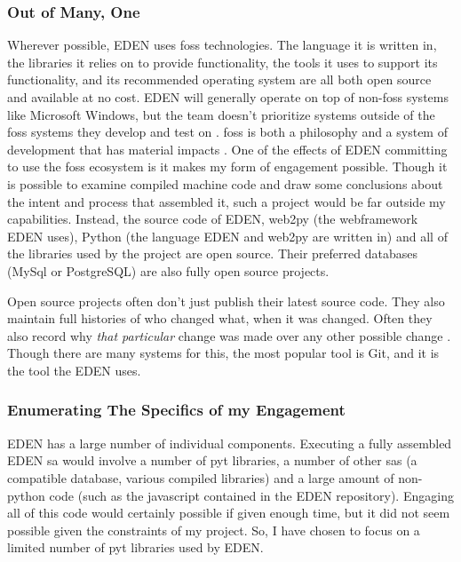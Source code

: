 \documentclass[a4paper,man,natbib,floatsintext]{apa6}
\begin{document}
   \subsubsection{Out of Many, One}
   Wherever possible, \gls{EDEN} uses \acrshort{foss} technologies. The language it is written in, the libraries it relies on to provide functionality, the tools it uses to support its functionality, and its recommended operating system are all both open source and available at no cost. \gls{EDEN} will generally operate on top of non-\acrshort{foss} systems like Microsoft Windows, but the team doesn't prioritize systems outside of the \acrshort{foss} systems they develop and test on \citep{Sahana_Foundation2015-zs}. \acrshort{foss} is both a philosophy and a system of development that has material impacts \citep{Kelty2008-jm}. One of the effects of \gls{EDEN} committing to use the \acrshort{foss} ecosystem is it makes my form of engagement possible. Though it is possible to examine compiled machine code and draw some conclusions about the intent and process that assembled it, such a project would be far outside my capabilities. Instead, the source code of \gls{EDEN}, web2py (the \gls{webframework} \gls{EDEN} uses), Python (the language \gls{EDEN} and web2py are written in) and all of the libraries used by the project are open source. Their preferred databases (MySql or PostgreSQL) are also fully open source projects. 

   Open source projects often don't just publish their latest source code. They also maintain full histories of who changed what, when it was changed. Often they also record why \textit{that particular} change was made over any other possible change \citep[p. 13-16]{Chacon2014-im}. Though there are many systems for this, the most popular tool is Git, and it is the tool the \gls{EDEN} uses. 

   \subsubsection{Enumerating The Specifics of my Engagement}
   
   \gls{EDEN} has a large number of individual components. Executing a fully assembled \gls{EDEN} \gls{sa} would involve a number of \Gls{pyt} libraries, a number of other \glspl{sa} (a compatible database, various compiled libraries) and a large amount of non-python code (such as the javascript contained in the \gls{EDEN} repository). Engaging all of this code would certainly possible if given enough time, but it did not seem possible given the constraints of my project. So, I have chosen to focus on a limited number of \Gls{pyt} libraries used by \gls{EDEN}. 
\end{document}

